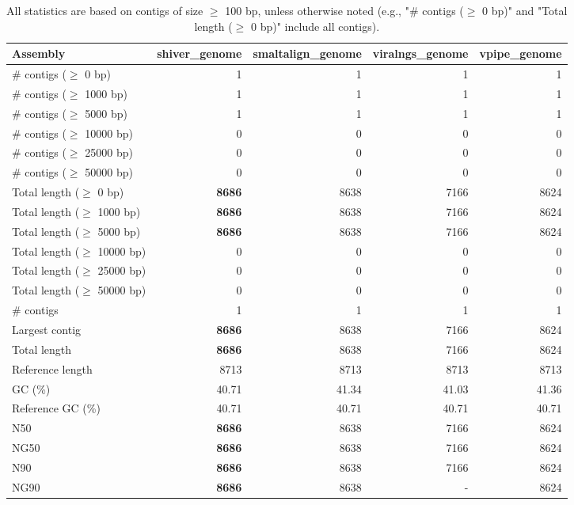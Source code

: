 \documentclass[12pt,a4paper]{article}
\begin{document}
\begin{table}[ht]
\begin{center}
\caption{All statistics are based on contigs of size $\geq$ 100 bp, unless otherwise noted (e.g., "\# contigs ($\geq$ 0 bp)" and "Total length ($\geq$ 0 bp)" include all contigs).}
\begin{tabular}{|l*{4}{|r}|}
\hline
Assembly & shiver\_genome & smaltalign\_genome & viralngs\_genome & vpipe\_genome \\ \hline
\# contigs ($\geq$ 0 bp) & 1 & 1 & 1 & 1 \\ \hline
\# contigs ($\geq$ 1000 bp) & 1 & 1 & 1 & 1 \\ \hline
\# contigs ($\geq$ 5000 bp) & 1 & 1 & 1 & 1 \\ \hline
\# contigs ($\geq$ 10000 bp) & 0 & 0 & 0 & 0 \\ \hline
\# contigs ($\geq$ 25000 bp) & 0 & 0 & 0 & 0 \\ \hline
\# contigs ($\geq$ 50000 bp) & 0 & 0 & 0 & 0 \\ \hline
Total length ($\geq$ 0 bp) & {\bf 8686} & 8638 & 7166 & 8624 \\ \hline
Total length ($\geq$ 1000 bp) & {\bf 8686} & 8638 & 7166 & 8624 \\ \hline
Total length ($\geq$ 5000 bp) & {\bf 8686} & 8638 & 7166 & 8624 \\ \hline
Total length ($\geq$ 10000 bp) & 0 & 0 & 0 & 0 \\ \hline
Total length ($\geq$ 25000 bp) & 0 & 0 & 0 & 0 \\ \hline
Total length ($\geq$ 50000 bp) & 0 & 0 & 0 & 0 \\ \hline
\# contigs & 1 & 1 & 1 & 1 \\ \hline
Largest contig & {\bf 8686} & 8638 & 7166 & 8624 \\ \hline
Total length & {\bf 8686} & 8638 & 7166 & 8624 \\ \hline
Reference length & 8713 & 8713 & 8713 & 8713 \\ \hline
GC (\%) & 40.71 & 41.34 & 41.03 & 41.36 \\ \hline
Reference GC (\%) & 40.71 & 40.71 & 40.71 & 40.71 \\ \hline
N50 & {\bf 8686} & 8638 & 7166 & 8624 \\ \hline
NG50 & {\bf 8686} & 8638 & 7166 & 8624 \\ \hline
N90 & {\bf 8686} & 8638 & 7166 & 8624 \\ \hline
NG90 & {\bf 8686} & 8638 & - & 8624 \\ \hline

\end{tabular}
\end{center}
\end{table}
\end{document}
